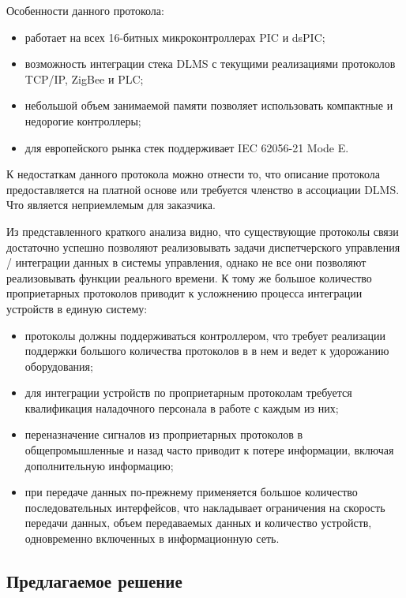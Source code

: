 Особенности данного протокола:

\begin{itemize}
 \item работает на всех 16-битных микроконтроллерах PIC и dsPIC;
 \item возможность интеграции стека DLMS с текущими реализациями протоколов TCP/IP, ZigBee и PLC;
 \item небольшой объем занимаемой памяти позволяет использовать компактные и недорогие контроллеры;
 \item для европейского рынка стек поддерживает IEC 62056-21 Mode E.
\end{itemize}

К недостаткам данного протокола можно отнести то, что описание протокола предоставляется на платной основе или требуется членство в ассоциации DLMS. Что является неприемлемым для заказчика.

Из представленного краткого анализа видно, что существующие протоколы связи достаточно успешно позволяют реализовывать задачи диспетчерского управления / интеграции данных в системы управления, однако не все они позволяют реализовывать функции реального времени. К тому же большое количество проприетарных протоколов приводит к усложнению процесса интеграции устройств в единую систему: 

\begin{itemize}
 \item протоколы должны поддерживаться контроллером, что требует реализации поддержки большого количества протоколов в в нем и ведет к удорожанию оборудования;
 \item для интеграции устройств по проприетарным протоколам требуется квалификация наладочного персонала в работе с каждым из них;
 \item переназначение сигналов из проприетарных протоколов в общепромышленные и назад часто приводит к потере информации, включая дополнительную информацию;
 \item при передаче данных по-прежнему применяется большое количество последовательных интерфейсов, что накладывает ограничения на скорость передачи данных, объем передаваемых данных и количество устройств, одновременно включенных в информационную сеть.
\end{itemize}

\subsection{Предлагаемое решение}

